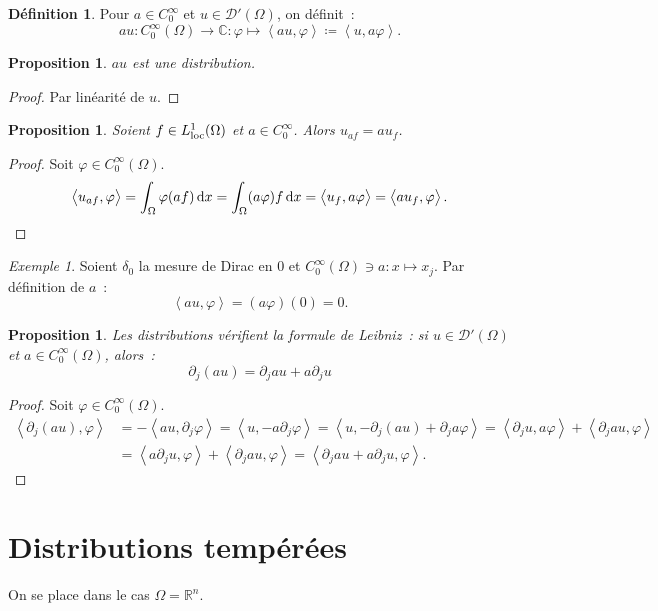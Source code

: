 \documentclass{report}
\newcommand{\C}{{\mathbb C}}
\newcommand{\R}{{\mathbb R}}
\newcommand{\scpr}[2]{\left\langle#1, #2\right\rangle}
\newcommand{\loc}{{\text{\textnormal{loc}}}}
\newtheorem{prp}[thm]{Proposition}
\theoremstyle{definition}
\newtheorem{déf}[thm]{Définition}
\theoremstyle{remark}
\newtheorem{ex}{Exemple}[chapter]
\begin{document}
\begin{déf} Pour $a \in C^\infty_0$ et $u \in \mathcal D'(\Omega)$, on définit~:
\[au : C^\infty_0(\Omega) \to \C : \varphi \mapsto \scpr {au}\varphi \coloneqq \scpr u{a\varphi}.\]
\end{déf}

\begin{prp} $au$ est une distribution.
\end{prp}

\begin{proof} Par linéarité de $u$.
\end{proof}

\begin{prp} Soient $f \in L^1_\loc(\Omega)$ et $a \in C^\infty_0$. Alors $u_{af} = au_f$.
\end{prp}

\begin{proof} Soit $\varphi \in C^\infty_0(\Omega)$.
\[\scpr {u_{af}}\varphi = \int_\Omega \varphi (af)\dif x = \int_\Omega(a\varphi)f\dif x = \scpr {u_f}{a\varphi} = \scpr {au_f}\varphi.\]
\end{proof}

\begin{ex} Soient $\delta_0$ la mesure de Dirac en 0 et $C^\infty_0(\Omega) \ni a : x \mapsto x_j$. Par définition de $a$~:
\[\scpr {au}\varphi = (a\varphi)(0) = 0.\]
\end{ex}

\begin{prp} Les distributions vérifient la formule de Leibniz~: si $u \in \mathcal D'(\Omega)$ et $a \in C^\infty_0(\Omega)$, alors~:
\[\partial_j(au) = \partial_jau + a\partial_ju\]
\end{prp}

\begin{proof} Soit $\varphi \in C^\infty_0(\Omega)$.
\begin{align*}
	\scpr {\partial_j(au)}\varphi &= -\scpr {au}{\partial_j\varphi} = \scpr u{-a\partial_j\varphi} = \scpr u{-\partial_j(au)+\partial_ja\varphi}
		= \scpr {\partial_ju}{a\varphi} + \scpr{\partial_jau}\varphi \\
	&= \scpr {a\partial_ju}\varphi + \scpr {\partial_jau}\varphi = \scpr {\partial_jau + a\partial_ju}\varphi.
\end{align*}
\end{proof}

\section{Distributions tempérées}
On se place dans le cas $\Omega = \R^n$.
\end{document}
